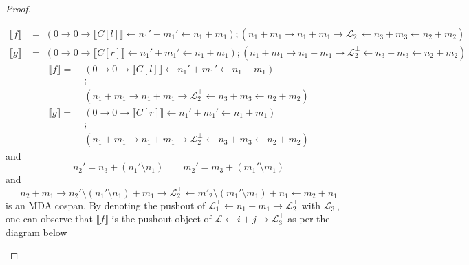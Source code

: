 \begin{proof}
\begin{itemize}
            \ifdefined \ONECOLUMN
            \begin{align*}
                \llbracket f \rrbracket &= \;
                (0 \to 0 \to \llbracket C[l] \rrbracket \xleftarrow{} n_1' + m_1' \xleftarrow{} n_1 + m_1)
                ;
                (n_1 + m_1 \xrightarrow{} n_1 + m_1 \xrightarrow{} \mathcal{L}_2^{\bot} \xleftarrow{} n_3 + m_3 \xleftarrow{} n_2 + m_2)\\
                \llbracket g \rrbracket &= \;
                (0 \to 0 \to \llbracket C[r] \rrbracket \xleftarrow{} n_1' + m_1' \xleftarrow{} n_1 + m_1)
                ;
                (n_1 + m_1 \xrightarrow{} n_1 + m_1 \xrightarrow{} \mathcal{L}_2^{\bot} \xleftarrow{} n_3 + m_3 \xleftarrow{} n_2 + m_2)
                \end{align*}
            \else
            \begin{align*}
            \llbracket f \rrbracket = \;
            &(0 \to 0 \to \llbracket C[l] \rrbracket \xleftarrow{} n_1' + m_1' \xleftarrow{} n_1 + m_1)\\
            &;\\
            &(n_1 + m_1 \xrightarrow{} n_1 + m_1 \xrightarrow{} \mathcal{L}_2^{\bot} \xleftarrow{} n_3 + m_3 \xleftarrow{} n_2 + m_2)\\
            \llbracket g \rrbracket = \;
            &(0 \to 0 \to \llbracket C[r] \rrbracket \xleftarrow{} n_1' + m_1' \xleftarrow{} n_1 + m_1)\\
            &;\\
            &(n_1 + m_1 \xrightarrow{} n_1 + m_1 \xrightarrow{} \mathcal{L}_2^{\bot} \xleftarrow{} n_3 + m_3 \xleftarrow{} n_2 + m_2)
            \end{align*}
            \fi
            and
            \[
                n_2' = n_3 + (n_1' \setminus n_1) \qquad m_2' = m_3 + (m_1' \setminus m_1)
            \]
            and
            \[
            n_2 + m_1 \xrightarrow{} n_2' \setminus (n_1' \setminus n_1) + m_1 \xrightarrow{} \mathcal{L}_{2}^{\bot} \xleftarrow{} m'_2 \setminus (m_1' \setminus m_1) + n_1 \xleftarrow{} m_2 + n_1    
            \] is an MDA cospan.
            By denoting the pushout of $\mathcal{L}_1^{\bot} \xleftarrow{} n_1 + m_1 \xrightarrow{} \mathcal{L}_{2}^{\bot}$ with $\mathcal{L}_3^{\bot}$,
            one can observe that $\llbracket f \rrbracket$ is the pushout object of $\mathcal{L} \xleftarrow{} i+j \xrightarrow{} \mathcal{L}_{3}^{\bot}$ as per the diagram below

\end{itemize}
\end{proof}
